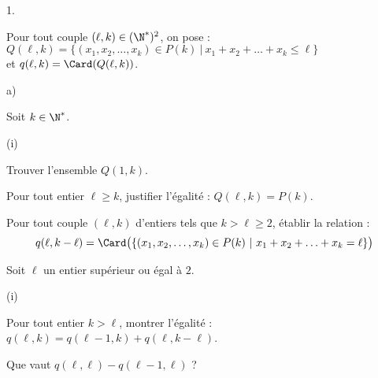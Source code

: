 \documentclass[11pt]{article}%
\begin{document}
  \begin{noliste}{1.}
    \setcounter{enumi}{3}
  \item Pour tout couple $(\ell,k) \in (\N^*)^2$, on pose : \
    $Q(\ell,k)=\{(x_1,x_2, \ldots, x_k)\in P(k) \ | \ x_1+x_2
    +\ldots +x_k \leq \ell\}$\\ et $q(\ell, k)=\Card(Q(\ell,k))$.
  \begin{noliste}{a)}
    \setlength{\itemsep}{2mm}
    \item Soit $k \in \N^*$.
    \begin{nonoliste}{(i)}
      \item Trouver l'ensemble $Q(1,k)$.

        
      
      \item Pour tout entier $\ell \geq k$, justifier l'égalité :
        $Q(\ell, k) = P(k)$.
        
        
        \end{nonoliste}

    \item Pour tout couple $(\ell,k)$ d'entiers tels que $k > \ell 
    \geq 2$, établir la relation :
    \[
    q(\ell,k-\ell) = \Card\big(\{(x_1,x_2,\ldots,x_k) \in P(k) \ | \
      x_1+x_2 +\ldots + x_k=\ell \}\big)
    \]

    


    
    
  \item Soit $\ell$ un entier supérieur ou égal à $2$.
    \begin{nonoliste}{(i)}
    \item Pour tout entier $k > \ell$, montrer l'égalité : \
      $q(\ell,k) = q(\ell-1,k) + q(\ell, k-\ell)$.
      
      

    \item Que vaut $q(\ell,\ell) - q(\ell-1,\ell)$ ?

      
    \end{nonoliste}
  \end{noliste}
  

\end{noliste}
\end{document}
